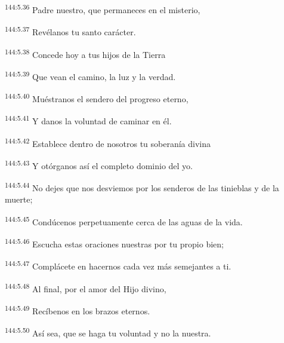 \begin{center}
\par 
\textsuperscript{144:5.36} Padre nuestro, que permaneces en el misterio,

\par 
\textsuperscript{144:5.37} Revélanos tu santo carácter.

\par 
\textsuperscript{144:5.38} Concede hoy a tus hijos de la Tierra

\par 
\textsuperscript{144:5.39} Que vean el camino, la luz y la verdad.

\par 
\textsuperscript{144:5.40} Muéstranos el sendero del progreso eterno,

\par 
\textsuperscript{144:5.41} Y danos la voluntad de caminar en él.

\par 
\textsuperscript{144:5.42} Establece dentro de nosotros tu soberanía divina

\par 
\textsuperscript{144:5.43} Y otórganos así el completo dominio del yo.

\par 
\textsuperscript{144:5.44} No dejes que nos desviemos por los senderos de las tinieblas y de la muerte;

\par 
\textsuperscript{144:5.45} Condúcenos perpetuamente cerca de las aguas de la vida.

\par 
\textsuperscript{144:5.46} Escucha estas oraciones nuestras por tu propio bien;

\par 
\textsuperscript{144:5.47} Complácete en hacernos cada vez más semejantes a ti.

\par 
\textsuperscript{144:5.48} Al final, por el amor del Hijo divino,

\par 
\textsuperscript{144:5.49} Recíbenos en los brazos eternos.

\par 
\textsuperscript{144:5.50} Así sea, que se haga tu voluntad y no la nuestra.
\end{center}

